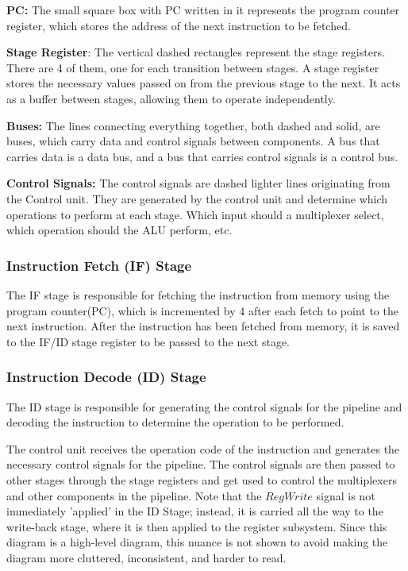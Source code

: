 \textbf{PC:} The small square box with PC written in it represents the program counter register, which stores the address of the next instruction to be fetched. 

\textbf{Stage Register}: The vertical dashed rectangles represent the stage registers. There are 4 of them, one for each transition between stages. A stage register stores the necessary values passed on from the previous stage to the next. It acts as a buffer between stages, allowing them to operate independently.

\textbf{Buses:} The lines connecting everything together, both dashed and solid, are buses, which carry data and control signals between components. A bus that carries data is a data bus, and a bus that carries control signals is a control bus.

\textbf{Control Signals:} The control signals are dashed lighter lines originating from the Control unit. They are generated by the control unit and determine which operations to perform at each stage. Which input should a multiplexer select, which operation should the ALU perform, etc.

\subsubsection{Instruction Fetch (IF) Stage}
The IF stage is responsible for fetching the instruction from memory using the program counter(PC), which is incremented by 4 after each fetch to point to the next instruction. After the instruction has been fetched from memory, it is saved to the IF/ID stage register to be passed to the next stage. 

\subsubsection{Instruction Decode (ID) Stage}
The ID stage is responsible for generating the control signals for the pipeline and decoding the instruction to determine the operation to be performed. 

The control unit receives the operation code of the instruction and generates the necessary control signals for the pipeline. The control signals are then passed to other stages through the stage registers and get used to control the multiplexers and other components in the pipeline. Note that the $RegWrite$ signal is not immediately 'applied' in the ID Stage; instead, it is carried all the way to the write-back stage, where it is then applied to the register subsystem. Since this diagram is a high-level diagram, this nuance is not shown to avoid making the diagram more cluttered, inconsistent, and harder to read.

